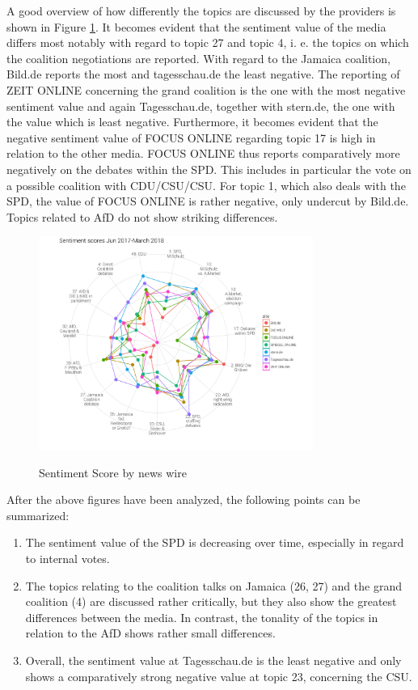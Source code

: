 \documentclass[12pt,a4paper,notitlepage]{article}
\begin{document}
A good overview of how differently the topics are discussed by the providers is shown in Figure \ref{fig_sentscore_radar}. It becomes evident that the sentiment value of the media differs most notably with regard to topic 27 and topic 4, i. e. the topics on which the coalition negotiations are reported. With regard to the Jamaica coalition, Bild.de reports the most and tagesschau.de the least negative. The reporting of ZEIT ONLINE concerning the grand coalition is the one with the most negative sentiment value and again Tagesschau.de, together with stern.de, the one with the value which is least negative. Furthermore, it becomes evident that the negative sentiment value of FOCUS ONLINE regarding topic 17 is high in relation to the other media. FOCUS ONLINE thus reports comparatively more negatively on the debates within the SPD. This includes in particular the vote on a possible coalition with CDU/CSU/CSU. For topic 1, which also deals with the SPD, the value of FOCUS ONLINE is rather negative, only undercut by Bild.de. Topics related to AfD do not show striking differences. 

\begin{figure}[H]
	\caption{Sentiment Score by news wire}
	\begin{center}
			\includegraphics[width=0.8\textwidth,keepaspectratio]{../figs/sentscore_radar.png}
			\label{fig_sentscore_radar}
	\end{center}
\end{figure}

After the above figures have been analyzed, the following points can be summarized:

\begin{enumerate}
	\item The sentiment value of the SPD is decreasing over time, especially in regard to internal votes. 
	\item The topics relating to the coalition talks on Jamaica (26, 27) and the grand coalition (4) are discussed rather critically, but they also show the greatest differences between the media. In contrast, the tonality of the topics in relation to the AfD shows rather small differences. 
	\item Overall, the sentiment value at Tagesschau.de is the least negative and only shows a comparatively strong negative value at topic 23, concerning the CSU.
\end{enumerate} 
\end{document}
